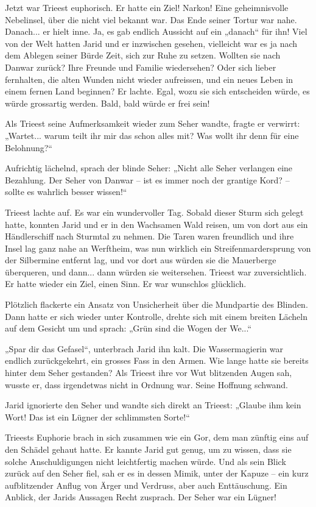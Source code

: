 Jetzt war Trieest euphorisch. Er hatte ein Ziel! Narkon! Eine geheimnisvolle Nebelinsel, über die nicht viel bekannt war. Das Ende seiner Tortur war nahe. Danach... er hielt inne. Ja, es gab endlich Aussicht auf ein „danach“ für ihn! Viel von der Welt hatten Jarid und er inzwischen gesehen, vielleicht war es ja nach dem Ablegen seiner Bürde Zeit, sich zur Ruhe zu setzen. Wollten sie nach Danwar zurück? Ihre Freunde und Familie wiedersehen? Oder sich lieber fernhalten, die alten Wunden nicht wieder aufreissen, und ein neues Leben in einem fernen Land beginnen? Er lachte. Egal, wozu sie sich entscheiden würde, es würde grossartig werden. Bald, bald würde er frei sein!

Als Trieest seine Aufmerksamkeit wieder zum Seher wandte, fragte er verwirrt: „Wartet... warum teilt ihr mir das schon alles mit? Was wollt ihr denn für eine Belohnung?“

Aufrichtig lächelnd, sprach der blinde Seher: „Nicht alle Seher verlangen eine Bezahlung. Der Seher von Danwar – ist es immer noch der grantige Kord? – sollte es wahrlich besser wissen!“\bigskip



Trieest lachte auf. Es war ein wundervoller Tag. Sobald dieser Sturm sich gelegt hatte, konnten Jarid und er in den Wachsamen Wald reisen, um von dort aus ein Händlerschiff nach Sturmtal zu nehmen. Die Taren waren freundlich und ihre Insel lag ganz nahe an Werftheim, was nun wirklich ein Streifenmardersprung von der Silbermine entfernt lag, und vor dort aus würden sie die Mauerberge überqueren, und dann... dann würden sie weitersehen. Trieest war zuversichtlich. Er hatte wieder ein Ziel, einen Sinn. Er war wunschlos glücklich.

Plötzlich flackerte ein Ansatz von Unsicherheit über die Mundpartie des Blinden. Dann hatte er sich wieder unter Kontrolle, drehte sich mit einem breiten Lächeln auf dem Gesicht um und sprach: „Grün sind die Wogen der We...“

„Spar dir das Gefasel“, unterbrach Jarid ihn kalt. Die Wassermagierin war endlich zurückgekehrt, ein grosses Fass in den Armen. Wie lange hatte sie bereits hinter dem Seher gestanden? Als Trieest ihre vor Wut blitzenden Augen sah, wusste er, dass irgendetwas nicht in Ordnung war. Seine Hoffnung schwand.

Jarid ignorierte den Seher und wandte sich direkt an Trieest: „Glaube ihm kein Wort! Das ist ein Lügner der schlimmsten Sorte!“

Trieests Euphorie brach in sich zusammen wie ein Gor, dem man zünftig eins auf den Schädel gehaut hatte. Er kannte Jarid gut genug, um zu wissen, dass sie solche Anschuldigungen nicht leichtfertig machen würde. Und als sein Blick zurück auf den Seher fiel, sah er es in dessen Mimik, unter der Kapuze – ein kurz aufblitzender Anflug von Ärger und Verdruss, aber auch Enttäuschung. Ein Anblick, der Jarids Aussagen Recht zusprach. Der Seher war ein Lügner!

